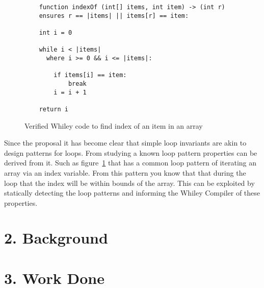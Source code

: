 \documentclass[11pt, a4paper, twoside, openright]{report}
\begin{document}
\begin{figure}[h]
\begin{lstlisting}
    function indexOf (int[] items, int item) -> (int r)
    ensures r == |items| || items[r] == item:

    int i = 0

    while i < |items|
      where i >= 0 && i <= |items|:

        if items[i] == item:
            break
        i = i + 1

    return i
\end{lstlisting}
\caption{Verified Whiley code to find index of an item in an array}
\label{lst:whiley-ex-1}
\end{figure}

Since the proposal it has become clear that simple loop invariants are
akin to design patterns for loops.
From studying a known loop pattern properties can be derived from it.
Such as figure~\ref{lst:whiley-ex-1} that has a common loop pattern of
iterating an array via an index variable.
From this pattern you know that that during the loop that the index will be
within bounds of the array.
This can be exploited by statically detecting the loop patterns and informing
the Whiley Compiler of these properties.

\section*{2. Background}


\cite{whiley-origin} \cite{whiley-design}
\cite{dafny-started}




\section*{3. Work Done}
\end{document}
